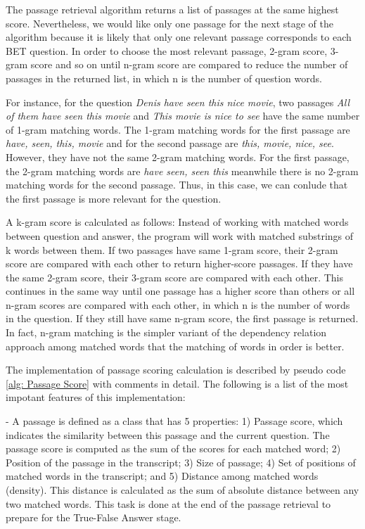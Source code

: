 The passage retrieval algorithm returns a list of passages at the same highest score. Nevertheless, we would like only one passage for the next stage of the algorithm because it is likely that only one relevant passage corresponds to each BET question. In order to choose the most relevant passage, 2-gram score, 3-gram score and so on until n-gram score are compared to reduce the number of passages in the returned list, in which n is the number of question words. 

For instance, for the question \textit{Denis have seen this nice movie}, two passages \textit{All of them have seen this movie } and \textit{This movie is nice to see} have the same number of 1-gram matching words. The 1-gram matching words for the first passage are \textit{have, seen, this, movie} and for the second passage are \textit{this, movie, nice, see}. However, they have not the same 2-gram matching words. For the first passage, the 2-gram matching words are \textit{have seen, seen this} meanwhile there is no 2-gram matching words for the second passage. Thus, in this case, we can conlude that the first passage is more relevant for the question. 

A k-gram score is calculated as follows: Instead of working with matched words between question and answer, the program will work with matched substrings of k words between them. If two passages have same 1-gram score, their 2-gram score are compared with each other to return higher-score passages. If they have the same 2-gram score, their 3-gram score are compared with each other. This continues in the same way until one passage has a higher score than others or all n-gram scores are compared with each other, in which n is the number of words in the question. If they still have same n-gram score, the first passage is returned. In fact, n-gram matching is the simpler variant of the dependency relation approach among matched words that the matching of words in order is better.



The implementation of passage scoring calculation is described by pseudo code \ref{alg: Passage Score} with comments in detail. The following is a list of the most impotant features of this implementation:

- A passage is defined as a class that has 5 properties: 1) Passage score, which indicates the similarity between this passage and the current question. The passage score is computed as the sum of the scores for each matched word; 2) Position of the passage in the transcript; 3) Size of passage; 4) Set of positions of matched words in the transcript; and 5) Distance among matched words (density). This distance is calculated as the sum of absolute distance between any two matched words. This task is done at the end of the passage retrieval to prepare for the True-False Answer stage.


